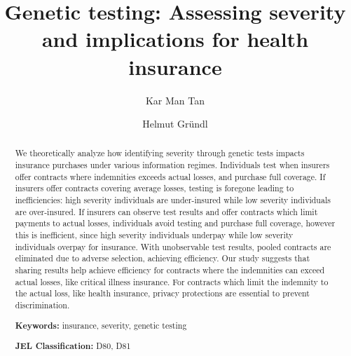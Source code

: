 \documentclass[nonatbib,preprint,12pt]{elsarticle}
\theoremstyle{plain}
\theoremstyle{definition}
\theoremstyle{plain}
\theoremstyle{TheoremNum}
\theoremstyle{CorollaryNum}
\theoremstyle{PropositionNum}
\theoremstyle{TheoremNum}
\begin{document}
\begin{frontmatter}

\title{Genetic testing: Assessing severity and implications for health insurance}


\author{Kar Man Tan}


\author{Helmut Gründl}


\address{Department of Finance, Faculty of Economics and Business, Goethe University Frankfurt \\ Theodor-W.-Adorno Platz 3, 60323, Frankfurt am Main}


\begin{abstract}

\footnotesize{We theoretically analyze how identifying severity through genetic tests impacts insurance purchases under various information regimes. Individuals test when insurers offer contracts where indemnities exceeds actual losses, and purchase full coverage. If insurers offer contracts covering average losses, testing is foregone leading to inefficiencies: high severity individuals are under-insured while low severity individuals are over-insured. If insurers can observe test results and offer contracts which limit payments to actual losses, individuals avoid testing and purchase full coverage, however this is inefficient, since high severity individuals underpay while low severity individuals overpay for insurance. With unobservable test results, pooled contracts are eliminated due to adverse selection, achieving efficiency. Our study suggests that sharing results help achieve efficiency for contracts where the indemnities can exceed actual losses, like critical illness insurance. For contracts which limit the indemnity to the actual loss, like health insurance, privacy protections are essential to prevent discrimination.}


\textbf{Keywords:} insurance, severity, genetic testing

\textbf{JEL Classification:} D80, D81
\end{abstract}

\end{frontmatter}
\end{document}
